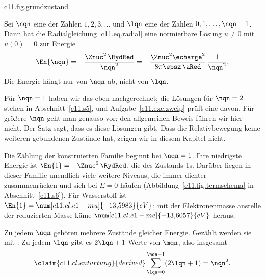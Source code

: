 \begin{tpcfigure}{c11.fig.grundzustand}
  \caption{Die Lösung $u(x) = x\,e^{-x}$ aus \eqref{c11.eq.grundzustand} im Potential, für $\Znuc = 1$. Dick: das effektive Potential für $\lqn = 0$. Dünne waagerechte Linie: die Energie $\En{1} = -\RydRed$. Die Funktion $u$ ist, wie in solchen Bildern üblich, auf dieser Linie als Grundlinie gezeichnet; ihre Höhe ist frei skaliert. Sie beginnt bei null, hat ihr Maximum bei $\rad = \aRed$ und fällt nach außen exponentiell ab.}
\end{tpcfigure}

\begin{theorem}\label{c11.thm.spektrum}
  Sei $\nqn$ eine der Zahlen $1, 2, 3, \ldots$ und $\lqn$ eine der Zahlen
  $0, 1, \ldots, \nqn - 1$. Dann hat die Radialgleichung \eqref{c11.eq.radial} eine
  normierbare Lösung $u \neq 0$ mit $u(0) = 0$ zur Energie
  \begin{equation}\label{c11.eq.energien}
    \En{\nqn} = -\frac{\Znuc^2\,\RydRed}{\nqn^2}
              = -\frac{\Znuc^2\echarge^2}{8\pi\epsz\,\aRed}\,\frac{1}{\nqn^2} .
  \end{equation}
  Die Energie hängt nur von $\nqn$ ab, nicht von $\lqn$.
\end{theorem}

Für $\nqn = 1$ haben wir das eben nachgerechnet; die Lösungen für $\nqn = 2$ stehen in
Abschnitt~\ref{c11.s5}, und Aufgabe~\ref{c11.exc.zweip} prüft eine davon. Für größere
$\nqn$ geht man genauso vor; den allgemeinen Beweis führen wir hier nicht.
Der Satz sagt, dass es diese Lösungen gibt. Dass die Relativbewegung keine weiteren gebundenen Zustände hat, zeigen
wir in diesem Kapitel nicht.


Die Zählung der konstruierten Familie beginnt bei $\nqn = 1$. Ihre niedrigste Energie
ist $\En{1} = -\Znuc^2\,\RydRed$, die des Zustands 1s. Darüber liegen in dieser Familie
unendlich viele weitere Niveaus, die immer dichter zusammenrücken und sich bei $E = 0$
häufen (Abbildung~\ref{c11.fig.termschema} in Abschnitt~\ref{c11.s6}). Für Wasserstoff ist
$\En{1} = \num[c11.cl.e1-mu]{-13{,}5983}{eV}$; mit der Elektronenmasse anstelle der
reduzierten Masse käme $\num[c11.cl.e1-me]{-13{,}6057}{eV}$ heraus.

Zu jedem $\nqn$ gehören mehrere Zustände gleicher Energie. Gezählt werden sie mit
: Zu jedem $\lqn$ gibt es $2\lqn + 1$ Werte von $\mqn$, also insgesamt
\begin{equation}\label{c11.eq.entartung}\claim{c11.cl.entartung}{derived}
  \sum_{\lqn = 0}^{\nqn - 1} (2\lqn + 1) = \nqn^2 .
\end{equation}

